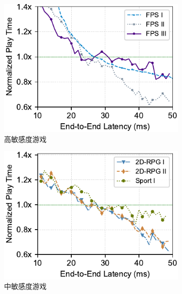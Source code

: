 \begin{figure}[htbp]
\centering
\begin{subfigure}[t]{0.33\linewidth}
  \centering
  \includegraphics[width=\linewidth]{figures/chap03/measurement_data/delay-sensitive.pdf}
  \caption{高敏感度游戏}
  \label{fig-real-measurement-results-High-Delay-Sensitivity-Games}
\end{subfigure}%
\begin{subfigure}[t]{0.33\linewidth}
  \centering
  \includegraphics[width=\linewidth]{figures/chap03/measurement_data/delay-linear-sensitive.pdf}
  \caption{中敏感度游戏}
  \label{fig-real-measurement-Medium-Delay-Sensitivity-Games}
\end{subfigure}
\begin{subfigure}[t]{0.33\linewidth}

\end{subfigure}
\end{figure}
